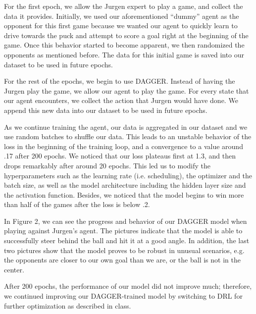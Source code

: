 \documentclass[10pt,twocolumn,letterpaper]{article}
\begin{document}
For the first epoch, we allow the Jurgen expert to play a game, and collect the data it provides. Initially, we used our aforementioned “dummy” agent as the opponent for this first game because we wanted our agent to quickly learn to drive towards the puck and attempt to score a goal right at the beginning of the game. Once this behavior started to become apparent, we then randomized the opponents as mentioned before. The data for this initial game is saved into our dataset to be used in future epochs.

For the rest of the epochs, we begin to use DAGGER. Instead of having the Jurgen play the game, we allow our agent to play the game. For every state that our agent encounters, we collect the action that Jurgen would have done. We append this new data into our dataset to be used in future epochs.

As we continue training the agent, our data is aggregated in our dataset and we use random batches to shuffle our data. This leads to an unstable behavior of the loss in the beginning of the training loop, and a convergence to a value around .17 after 200 epochs. We noticed that our loss plateaus first at 1.3, and then drops remarkably after around 20 epochs. This led us to modify the hyperparameters such as the learning rate (i.e. scheduling), the optimizer and the batch size, as well as the model architecture including the hidden layer size and the activation function. Besides, we noticed that the model begins to win more than half of the games after the loss is below .2.

In Figure 2, we can see the progress and behavior of our DAGGER model when playing against Jurgen’s agent. The pictures indicate that the model is able to successfully steer behind the ball and hit it at a good angle. In addition, the last two pictures show that the model proves to be robust in unusual scenarios, e.g. the opponents are closer to our own goal than we are, or the ball is not in the center.

After 200 epochs, the performance of our model did not improve much; therefore, we continued improving our DAGGER-trained model by switching to DRL for further optimization as described in class.
\end{document}
